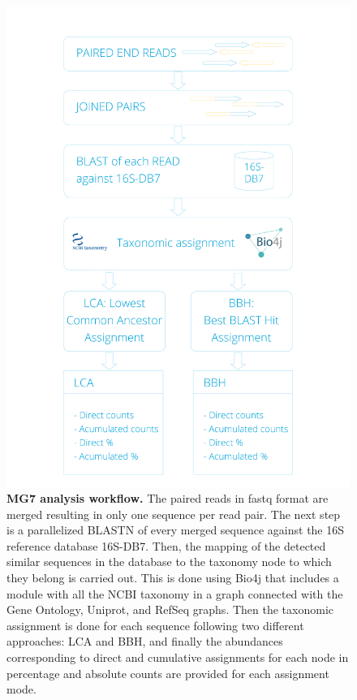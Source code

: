 \documentclass[fleqn,10pt,lineno]{wlpeerj}
\begin{document}
\begin{figure}[htbp]
\centering
\includegraphics{./Figure-1.jpg}
\caption{\textbf{MG7 analysis workflow.} The paired reads in fastq
format are merged resulting in only one sequence per read pair. The next
step is a parallelized BLASTN of every merged sequence against the 16S
reference database 16S-DB7. Then, the mapping of the detected similar
sequences in the database to the taxonomy node to which they belong is
carried out. This is done using Bio4j that includes a module with all
the NCBI taxonomy in a graph connected with the Gene Ontology, Uniprot,
and RefSeq graphs. Then the taxonomic assignment is done for each
sequence following two different approaches: LCA and BBH, and finally
the abundances corresponding to direct and cumulative assignments for
each node in percentage and absolute counts are provided for each
assignment mode.}
\end{figure}
\end{document}

